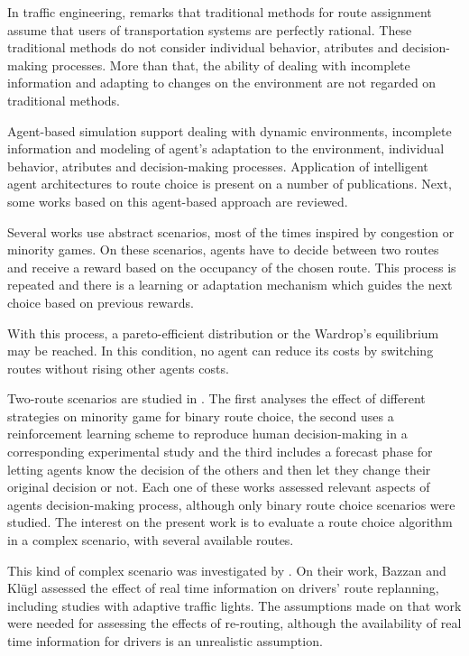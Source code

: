 \documentclass[12pt]{article}
\begin{document}
In traffic engineering, \cite{Bazzan&Kluegl2007} remarks that traditional methods for route assignment assume that users of transportation systems are perfectly rational. These traditional methods do not consider individual behavior, atributes and decision-making processes. More than that, the ability of dealing with incomplete information and adapting to changes on the environment are not regarded on traditional methods.

Agent-based simulation support dealing with dynamic environments, incomplete information and modeling of agent's adaptation to the environment, individual behavior, atributes and decision-making processes. Application of intelligent agent architectures to route choice is present on a number of publications. Next, some works based on this agent-based approach are reviewed.

Several works use abstract scenarios, most of the times inspired by congestion or minority games. On these scenarios, agents have to decide between two routes and receive a reward based on the occupancy of the chosen route. This process is repeated and there is a learning or adaptation mechanism which guides the next choice based on previous rewards.

With this process, a pareto-efficient distribution or the Wardrop's equilibrium \cite{Wardrop1952} may be reached. In this condition, no agent can reduce its costs by switching routes without rising other agents costs. 

Two-route scenarios are studied in \cite{Bazzan+2000icmas, Chmura&Pitz2007, Kluegl&Bazzan2004}. The first analyses the effect of different strategies on minority game for binary route choice, the second uses a reinforcement learning scheme to reproduce human decision-making in a corresponding experimental study and the third includes a forecast phase for letting agents know the decision of the others and then let they change their original decision or not. Each one of these works assessed relevant aspects of agents decision-making process, although only binary route choice scenarios were studied. The interest on the present work is to evaluate a route choice algorithm in a complex scenario, with several available routes.

This kind of complex scenario was investigated by \cite{Bazzan&Kluegl2008}. On their work, Bazzan and Kl\"ugl assessed the effect of real time information on drivers' route replanning, including studies with adaptive traffic lights. The assumptions made on that work were needed for assessing the effects of re-routing, although the availability of real time information for drivers is an unrealistic assumption.
\end{document}

